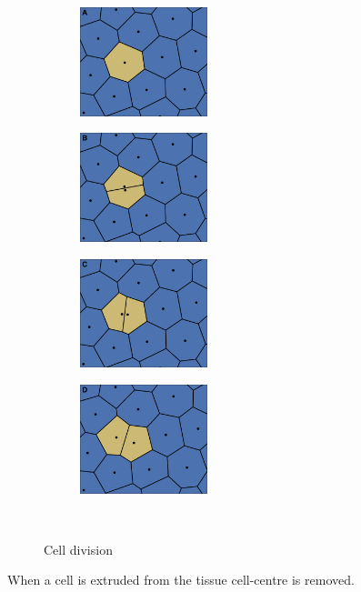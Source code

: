 \documentclass[a4paper]{article}
\begin{document}
\begin{figure}[htbp]
\centering
\begin{subfigure}{0.24\textwidth}
	\centering
	\includegraphics[width=3.7cm]{divide_1.png}
	\label{fig:divideA}
\end{subfigure} \hspace{0.02cm}
\centering
\begin{subfigure}{0.24\textwidth}
	\centering
	\includegraphics[width=3.7cm]{divide_2.png}
	\label{fig:divideA}
\end{subfigure} \hspace{0.02cm}
\centering
\begin{subfigure}{0.24\textwidth}
	\centering
	\includegraphics[width=3.7cm]{divide_3.png}
	\label{fig:divideA}
\end{subfigure} \hspace{0.02cm}
\centering
\begin{subfigure}{0.24\textwidth}
	\centering
	\includegraphics[width=3.7cm]{divide_4.png}
	\label{fig:divideA}
\end{subfigure} \\
\caption{Cell division}
\label{fig:manmade}
\end{figure}
When a cell is extruded from the tissue cell-centre is removed.
\end{document}

